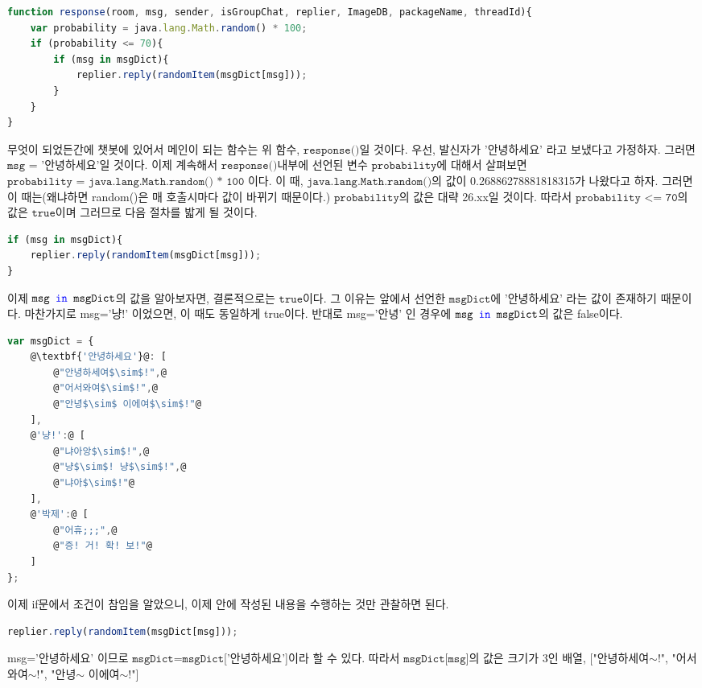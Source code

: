 \documentclass[10pt,a4paper,final]{book}
\begin{document}
\begin{lstlisting}[language=JavaScript,escapeinside=@@]
function response(room, msg, sender, isGroupChat, replier, ImageDB, packageName, threadId){
    var probability = java.lang.Math.random() * 100;
    if (probability <= 70){
        if (msg in msgDict){
            replier.reply(randomItem(msgDict[msg]));
        }
    }
}
\end{lstlisting}
무엇이 되었든간에 챗봇에 있어서 메인이 되는 함수는 위 함수, $\texttt{response()}$일 것이다. 우선, 발신자가 '안녕하세요'
라고 보냈다고 가정하자. 그러면 $\texttt{msg = '안녕하세요'}$일 것이다. 이제 계속해서 $\texttt{response()}$내부에 선언된
변수 $\texttt{probability}$에 대해서 살펴보면 $\texttt{probability = java.lang.Math.random() * 100}$ 이다.
이 때, $\texttt{java.lang.Math.random()}$의 값이 0.26886278881818315가 나왔다고 하자. 그러면
이 때는(왜냐하면 random()은 매 호출시마다 값이 바뀌기 때문이다.) $\texttt{probability}$의 값은
대략 26.xx일 것이다. 따라서 $\texttt{probability <= 70}$의 값은 $\texttt{true}$이며 그러므로 다음 절차를 밟게 될 것이다.
\begin{lstlisting}[language=JavaScript,escapeinside=@@]
if (msg in msgDict){
    replier.reply(randomItem(msgDict[msg]));
}
\end{lstlisting}
이제 $\texttt{msg \textcolor{blue}{in} msgDict}$의 값을 알아보자면, 결론적으로는 $\texttt{true}$이다.
그 이유는 앞에서 선언한 $\texttt{msgDict}$에 $\texttt{'안녕하세요'}$ 라는 값이 존재하기 때문이다.
마찬가지로 msg='냥!' 이었으면, 이 때도 동일하게 true이다. 반대로 msg='안녕' 인 경우에 $\texttt{msg \textcolor{blue}{in} msgDict}$의 값은 false이다.
\begin{lstlisting}[language=JavaScript,escapeinside=@@, caption={$\texttt{msgDict}$}]
var msgDict = {
    @\textbf{'안녕하세요'}@: [
        @"안녕하세여$\sim$!",@
        @"어서와여$\sim$!",@
        @"안녕$\sim$ 이에여$\sim$!"@
    ],
    @'냥!':@ [
        @"냐아앙$\sim$!",@
        @"냥$\sim$! 냥$\sim$!",@
        @"냐아$\sim$!"@
    ],
    @'박제':@ [
        @"어휴;;;",@
        @"증! 거! 확! 보!"@
    ]
};
\end{lstlisting}
이제 if문에서 조건이 참임을 알았으니, 이제 안에 작성된 내용을 수행하는 것만 관찰하면 된다.
\begin{lstlisting}[language=JavaScript,escapeinside=@@]
replier.reply(randomItem(msgDict[msg]));
\end{lstlisting}
msg='안녕하세요' 이므로 $\texttt{msgDict}$=$\texttt{msgDict}$['안녕하세요']이라 할 수 있다.
따라서 $\texttt{msgDict[msg]}$의 값은 크기가 3인 배열, ["안녕하세여$\sim$!", "어서와여$\sim$!", "안녕$\sim$ 이에여$\sim$!"]
\end{document}

